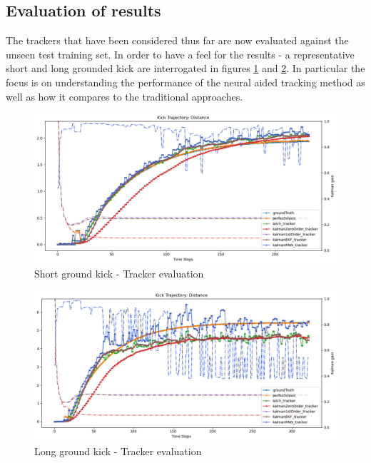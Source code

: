 \documentclass[a4paper,twoside,12pt]{report}
\begin{document}
\subsection{Evaluation of results}

The trackers that have been considered thus far are now evaluated against the unseen test training set. In order to have a feel for the results - a representative short and long grounded kick are interrogated in figures \ref{fig:evalgroundshort} and \ref{fig:evalgroundlong}. In particular the focus is on understanding the performance of the neural aided tracking method as well as how it compares to the traditional approaches.

\begin{figure}[h!]
\begin{center}
\includegraphics[width=12cm]{images/eval_ground_short.png}
\caption{Short ground kick - Tracker evaluation}
\label{fig:evalgroundshort}
\end{center}
\end{figure}

\begin{figure}[h!]
\begin{center}
\includegraphics[width=12cm]{images/eval_ground_long.png}
\caption{Long ground kick - Tracker evaluation}
\label{fig:evalgroundlong}
\end{center}
\end{figure}
\end{document}
